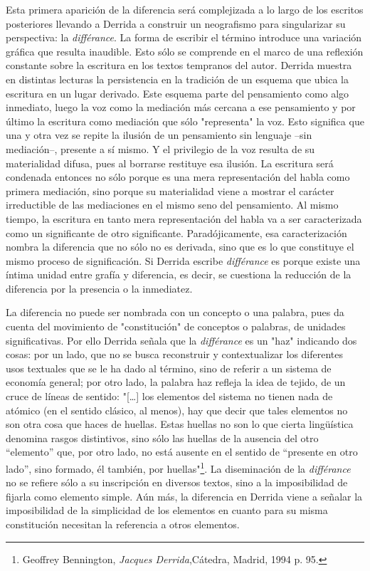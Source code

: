 \documentclass{book}
\begin{document}
Esta primera aparición de la diferencia será complejizada a lo largo de
los escritos posteriores llevando a Derrida a construir un neografismo
para singularizar su perspectiva: la \emph{différance}. La forma de
escribir el término introduce una variación gráfica que resulta
inaudible. Esto sólo se comprende en el marco de una reflexión constante
sobre la escritura en los textos tempranos del autor. Derrida muestra en
distintas lecturas la persistencia en la tradición de un esquema que
ubica la escritura en un lugar derivado. Este esquema parte del
pensamiento como algo inmediato, luego la voz como la mediación más
cercana a ese pensamiento y por último la escritura como mediación que
sólo "representa" la voz. Esto significa que una y otra vez se repite la
ilusión de un pensamiento sin lenguaje --sin mediación--, presente a sí
mismo. Y el privilegio de la voz resulta de su materialidad difusa, pues
al borrarse restituye esa ilusión. La escritura será condenada entonces
no sólo porque es una mera representación del habla como primera
mediación, sino porque su materialidad viene a mostrar el carácter
irreductible de las mediaciones en el mismo seno del pensamiento. Al
mismo tiempo, la escritura en tanto mera representación del habla va a
ser caracterizada como un significante de otro significante.
Paradójicamente, esa caracterización nombra la diferencia que no sólo no
es derivada, sino que es lo que constituye el mismo proceso de
significación. Si Derrida escribe \emph{différance} es porque existe una
íntima unidad entre grafía y diferencia, es decir, se cuestiona la
reducción de la diferencia por la presencia o la inmediatez.

La diferencia no puede ser nombrada con un concepto o una palabra, pues
da cuenta del movimiento de "constitución" de conceptos o palabras, de
unidades significativas. Por ello Derrida señala que la
\emph{différance} es un "haz" indicando dos cosas: por un lado, que no
se busca reconstruir y contextualizar los diferentes usos textuales que
se le ha dado al término, sino de referir a un sistema de economía
general; por otro lado, la palabra haz refleja la idea de tejido, de un
cruce de líneas de sentido: "{[}\ldots{]} los elementos del sistema no
tienen nada de atómico (en el sentido clásico, al menos), hay que decir
que tales elementos no son otra cosa que haces de huellas. Estas huellas
no son lo que cierta lingüística denomina rasgos distintivos, sino sólo
las huellas de la ausencia del otro ``elemento'' que, por otro lado, no
está ausente en el sentido de ``presente en otro lado'', sino formado,
él también, por huellas"\footnote{Geoffrey Bennington, \emph{Jacques
  Derrida},Cátedra, Madrid, 1994 p. 95.}. La diseminación de la
\emph{différance} no se refiere sólo a su inscripción en diversos
textos, sino a la imposibilidad de fijarla como elemento simple. Aún
más, la diferencia en Derrida viene a señalar la imposibilidad de la
simplicidad de los elementos en cuanto para su misma constitución
necesitan la referencia a otros elementos.
\end{document}
